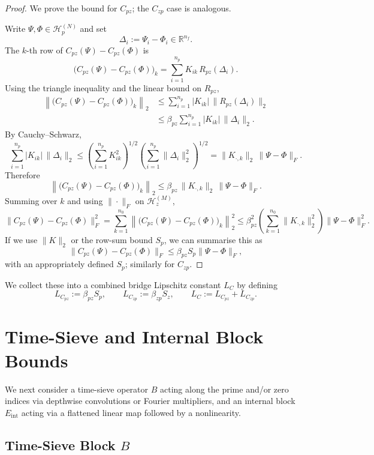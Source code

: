 \documentclass[11pt]{article}
\begin{document}
\begin{proof}
We prove the bound for $C_{pz}$; the $C_{zp}$ case is analogous.

Write $\Psi,\Phi \in \mathcal{H}_p^{(N)}$ and set
\[
  \Delta_i := \Psi_i - \Phi_i \in \mathbb{R}^{n_f}.
\]
The $k$-th row of $C_{pz}(\Psi) - C_{pz}(\Phi)$ is
\[
  \bigl(C_{pz}(\Psi) - C_{pz}(\Phi)\bigr)_k
  = \sum_{i=1}^{n_p} K_{ik}\, R_{pz}(\Delta_i).
\]
Using the triangle inequality and the linear bound on $R_{pz}$,
\begin{align*}
 \left\|\bigl(C_{pz}(\Psi) - C_{pz}(\Phi)\bigr)_k\right\|_2
 &\le \sum_{i=1}^{n_p} |K_{ik}| \,\|R_{pz}(\Delta_i)\|_2\\
 &\le \beta_{pz} \sum_{i=1}^{n_p} |K_{ik}| \,\|\Delta_i\|_2.
\end{align*}
By Cauchy--Schwarz,
\[
  \sum_{i=1}^{n_p} |K_{ik}| \,\|\Delta_i\|_2
  \le \left(\sum_{i=1}^{n_p} K_{ik}^2\right)^{1/2}
       \left(\sum_{i=1}^{n_p} \|\Delta_i\|_2^2\right)^{1/2}
  = \| K_{\cdot,k}\|_2 \, \|\Psi - \Phi\|_F.
\]
Therefore
\[
  \left\|\bigl(C_{pz}(\Psi) - C_{pz}(\Phi)\bigr)_k\right\|_2
  \le \beta_{pz} \,\|K_{\cdot,k}\|_2 \, \|\Psi - \Phi\|_F.
\]
Summing over $k$ and using $\|\cdot\|_F$ on $\mathcal{H}_z^{(M)}$,
\[
  \|C_{pz}(\Psi) - C_{pz}(\Phi)\|_F^2
  = \sum_{k=1}^{n_0}
      \left\|\bigl(C_{pz}(\Psi) - C_{pz}(\Phi)\bigr)_k\right\|_2^2
  \le \beta_{pz}^2
       \left(\sum_{k=1}^{n_0} \|K_{\cdot,k}\|_2^2\right)
       \|\Psi - \Phi\|_F^2.
\]
If we use $\|K\|_2$ or the row-sum bound $S_p$, we can summarise this as
\[
  \|C_{pz}(\Psi) - C_{pz}(\Phi)\|_F
  \le \beta_{pz} S_p \|\Psi - \Phi\|_F,
\]
with an appropriately defined $S_p$; similarly for $C_{zp}$.
\end{proof}

We collect these into a combined bridge Lipschitz constant $L_C$ by
defining
\[
  L_{C_{pz}} := \beta_{pz} S_p, \qquad
  L_{C_{zp}} := \beta_{zp} S_z,\qquad
  L_C := L_{C_{pz}} + L_{C_{zp}}.
\]

\section{Time-Sieve and Internal Block Bounds}

We next consider a time-sieve operator $B$ acting along the prime and/or
zero indices via depthwise convolutions or Fourier multipliers, and
an internal block $E_{\mathrm{int}}$ acting via a flattened linear map
followed by a nonlinearity.%

\subsection{Time-Sieve Block $B$}
\end{document}
